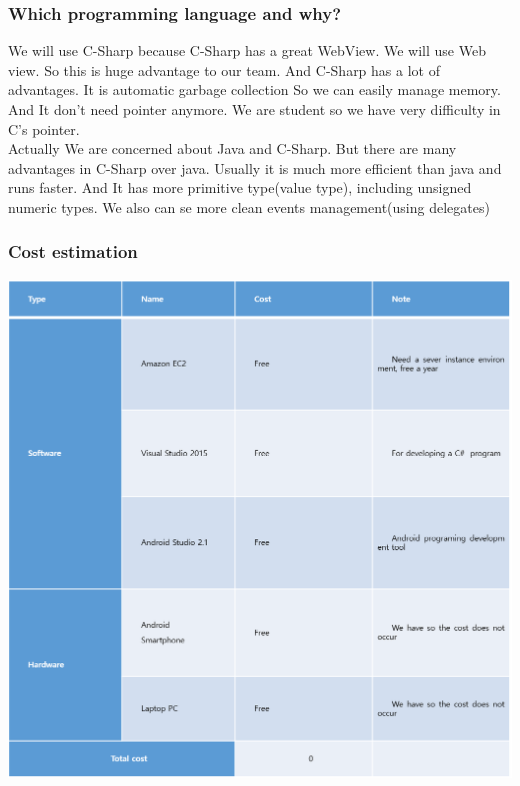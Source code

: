 \documentclass[12pt]{article}
\begin{document}
\subsubsection{Which programming language and why?}
 We will use C-Sharp because C-Sharp has a great WebView. We will use Web view. So this is huge advantage to our team. And C-Sharp has a lot of advantages. It is automatic garbage collection So we can easily manage memory. And It don’t need pointer anymore. We are student so we have very difficulty in C’s pointer. \\
 Actually We are concerned about Java and C-Sharp. But there are many advantages in C-Sharp over java. Usually it is much more efficient than java and runs faster. And It has more primitive type(value type), including unsigned numeric types. We also can se more clean events management(using delegates)\\


\subsubsection{Cost estimation}
\begin{center} 
\includegraphics[width=150mm,scale=2.2]{cost}
\end{center}

\end{document}
